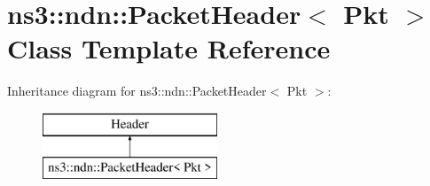\hypertarget{classns3_1_1ndn_1_1PacketHeader}{}\section{ns3\+:\+:ndn\+:\+:Packet\+Header$<$ Pkt $>$ Class Template Reference}
\label{classns3_1_1ndn_1_1PacketHeader}
Inheritance diagram for ns3\+:\+:ndn\+:\+:Packet\+Header$<$ Pkt $>$\+:\begin{figure}[H]
\begin{center}
\leavevmode
\includegraphics[height=2.000000cm]{classns3_1_1ndn_1_1PacketHeader}
\end{center}
\end{figure}
